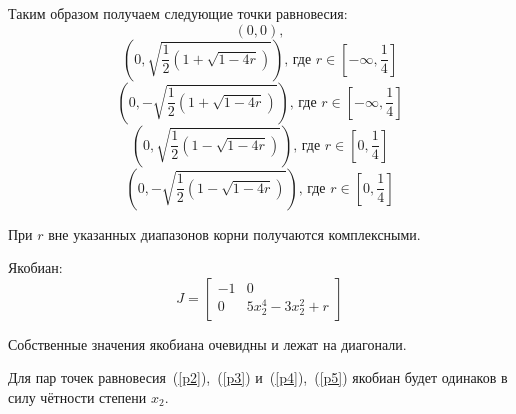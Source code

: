     Таким образом получаем следующие точки равновесия:\\\sloppy
    \begin{equation}
        (0, 0), \label{p1}
    \end{equation}
    \begin{equation}
        \left(0, \sqrt{\dfrac{1}{2}\left( 1 + \sqrt{1 - 4r} \right)}\right) \label{p2},\,\mbox{где } r \in \left[ -\infty, \dfrac{1}{4} \right]
    \end{equation}
    \begin{equation}
        \left(0, -\sqrt{\dfrac{1}{2}\left( 1 + \sqrt{1 - 4r} \right)} \right) \label{p3},\,\mbox{где } r \in \left[ -\infty, \dfrac{1}{4} \right]
    \end{equation}
    \begin{equation}
        \left(0, \sqrt{\dfrac{1}{2}\left( 1 - \sqrt{1 - 4r} \right)}\right) \label{p4},\,\mbox{где } r \in \left[ 0, \dfrac{1}{4} \right]
    \end{equation}
    \begin{equation}
        \left(0, -\sqrt{\dfrac{1}{2}\left( 1 - \sqrt{1 - 4r} \right)} \right)\label{p5},\,\mbox{где } r \in \left[ 0, \dfrac{1}{4} \right]
    \end{equation}

    При $r$ вне указанных диапазонов корни получаются комплексными.

    Якобиан:\\
    \begin{equation*}
        J=
        \begin{bmatrix}
            -1& 0\\
            0& 5x_2^4 - 3x_2^2 + r
        \end{bmatrix}
    \end{equation*}

    Собственные значения якобиана очевидны и лежат на диагонали.

    Для пар точек равновесия~(\ref{p2}),~(\ref{p3}) и~(\ref{p4}),~(\ref{p5}) якобиан будет одинаков в силу чётности степени $x_2$.

